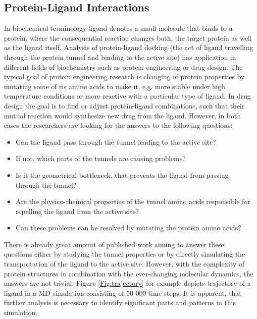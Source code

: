 \subsection{Protein-Ligand Interactions} 
In biochemical terminology ligand denotes a small molecule that binds to a protein, where the consequential reaction changes both, the target protein as well as the ligand itself. Analysis of protein-ligand docking (the act of ligand travelling through the protein tunnel and binding to the active site) has application in different fields of biochemistry such as protein engineering or drug design. The typical goal of protein engineering research is changing of protein properties by mutating some of its amino acids to make it, e.g. more stable under high temperature conditions or more reactive with a particular type of ligand. In drug design the goal is to find or adjust protein-ligand combinations, such that their mutual reaction would synthesize new drug from the ligand.
However, in both cases the researchers are looking for the answers to the following questions:
\begin{itemize}
\setlength\itemsep{0.5pt}
\item{Can the ligand pass through the tunnel leading to the active site?}
\item{If not, which parts of the tunnels are causing problems?}
\item{Is it the geometrical bottleneck, that prevents the ligand from passing through the tunnel?}
\item{Are the physico-chemical properties of the tunnel amino acids responsible for repelling the ligand from the active site?}
\item{Can these problems can be resolved by mutating the protein amino acids?}
\end{itemize}

There is already great amount of published work aiming to answer these questions either by studying the tunnel properties or by directly simulating the transportation of the ligand to the active site. However, with the complexity of protein structures in combination with the ever-changing molecular dynamics, the answers are not trivial. Figure \ref{Fig:trajectory} for example depicts trajectory of a ligand in a MD simulation consisting of 50 000 time steps. It is apparent, that further analysis is necessary to identify significant parts and patterns in this simulation. 

